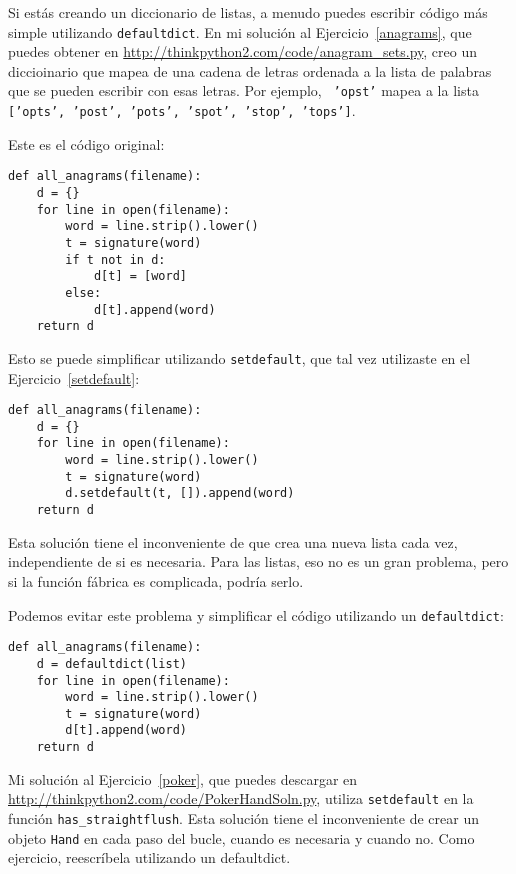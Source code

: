 \documentclass[10pt]{book}
\begin{document}
Si estás creando un diccionario de listas, a menudo puedes escribir código
más simple utilizando {\tt defaultdict}.  En mi solución al
Ejercicio~\ref{anagrams}, que puedes obtener en
\url{http://thinkpython2.com/code/anagram_sets.py}, creo un
diccioinario que mapea de una cadena de letras ordenada a la lista de
palabras que se pueden escribir con esas letras.  Por ejemplo, {\tt
  'opst'} mapea a la lista {\tt ['opts', 'post', 'pots', 'spot',
    'stop', 'tops']}.

Este es el código original:

\begin{verbatim}
def all_anagrams(filename):
    d = {}
    for line in open(filename):
        word = line.strip().lower()
        t = signature(word)
        if t not in d:
            d[t] = [word]
        else:
            d[t].append(word)
    return d
\end{verbatim}

Esto se puede simplificar utilizando {\tt setdefault}, que tal vez
utilizaste en el Ejercicio~\ref{setdefault}:

\begin{verbatim}
def all_anagrams(filename):
    d = {}
    for line in open(filename):
        word = line.strip().lower()
        t = signature(word)
        d.setdefault(t, []).append(word)
    return d
\end{verbatim}

Esta solución tiene el inconveniente de que crea una nueva lista
cada vez, independiente de si es necesaria.  Para las listas,
eso no es un gran problema, pero si la función
fábrica es complicada, podría serlo.

Podemos evitar este problema y
simplificar el código utilizando un {\tt defaultdict}:

\begin{verbatim}
def all_anagrams(filename):
    d = defaultdict(list)
    for line in open(filename):
        word = line.strip().lower()
        t = signature(word)
        d[t].append(word)
    return d
\end{verbatim}

Mi solución al Ejercicio~\ref{poker}, que puedes descargar en
\url{http://thinkpython2.com/code/PokerHandSoln.py},
utiliza {\tt setdefault} en la función
\verb"has_straightflush".  Esta solución tiene el inconveniente de
crear un objeto {\tt Hand} en cada paso del bucle, cuando
es necesaria y cuando no.  Como ejercicio, reescríbela utilizando
un defaultdict.
\end{document}
